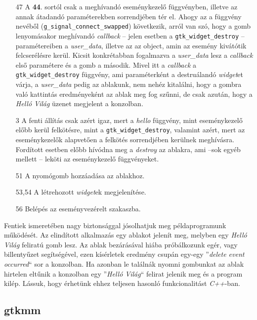 \documentclass[a4paper,10pt]{article}
\begin{document}
\begin{enumerate}
 \item[47] A \textbf{44}. sortól csak a meghívandó eseménykezelő függvényben, illetve az annak átadandó paraméterekben sorrendjében tér el. Ahogy az a függvény nevéből (\texttt{g\_signal\_connect\_swapped}) következik, arról van szó, hogy a gomb lenyomásakor meghívandó \textit{callback} -- jelen esetben a \texttt{gtk\_widget\_destroy} -- paramétereiben a \textit{user\_data}, illetve az az object, amin az esemény kivátótik felcserélésre kerül. Kicsit konkrétabban fogalmazva a \textit{user\_data} lesz a \textit{callback} első paramétere és a gomb a második. Mivel itt a \textit{callback} a \texttt{gtk\_widget\_destroy} függvény, ami paraméterként a destruálandó \textit{widget}et várja, a \textit{user\_data} pedig az ablakunk, nem nehéz kitalálni, hogy a gombra való kattintás eredményeként az ablak meg fog szűnni, de csak azután, hogy a \textit{Helló Világ} üzenet megjelent a konzolban.

 \item[3] A fenti állítás csak azért igaz, mert a \textit{hello} függvény, mint eseménykezelő előbb kerül felkötésre, mint a \texttt{gtk\_widget\_destroy}, valamint azért, mert az eseménykezelők alapvetően a felkötés sorrendjében kerülnek meghívásra. Fordított esetben előbb hívódna meg a \textit{destroy} az ablakra, ami --sok egyéb mellett -- leköti az eseménykezelő függvényeket.

 \item[51] A nyomógomb hozzáadása az ablakhoz.

 \item[53,54] A létrehozott \textit{widget}ek megjelenítése.

 \item[56] Belépés az eseményvezérelt szakaszba.

\end{enumerate}

Fentiek ismeretében nagy biztonsággal jósolhatjuk meg példaprogramunk működését. Az elindított alkalmazás egy ablakot jelenít meg, melyben egy \textit{Helló Világ} feliratú gomb lesz. Az ablak bezárásával hiába próbálkozunk egér, vagy billentyűzet segítségével, ezen kísérletek eredmény csupán egy-egy ''\textit{delete event occurred}`` sor a konzolban. Ha azonban le találnák nyomni gombunkat az ablak hirtelen eltűnik a konzolban egy ''\textit{Helló Világ}`` felirat jelenik meg és a program kilép. Lássuk, hogy érhetünk ehhez teljesen hasonló funkcionalitást \textit{C++}-ban.

\subsection{gtkmm}
\end{document}
